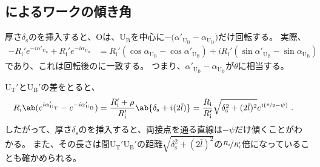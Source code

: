 \subsection{\Spacer によるワークの傾き角}
厚さ$\delta_\mathrm s$の\Spacer を挿入すると、\CurvatureCenter Oは、U$_\mathrm B$を中心に$-\big(\alpha'_{\mathrm U_\mathrm B}\!-\alpha_{\mathrm U_\mathrm B}\big)$だけ回転する。
実際、
\begin{align*}
  -R_\mathrm i'e^{-i\alpha'_{\mathrm U_\mathrm B}}+R_\mathrm i'e^{-i\alpha_{\mathrm U_\mathrm B}}
  &= R_\mathrm i'(\cos\alpha_{\mathrm U_\mathrm B}-\cos\alpha'_{\mathrm U_\mathrm B})
     +iR_\mathrm i'(\sin\alpha'_{\mathrm U_\mathrm B}-\sin\alpha_{\mathrm U_\mathrm B})
\end{align*}
であり、これは回転後の\nameCurvatureCenter{}に一致する。
つまり、$\alpha'_{\mathrm U_\mathrm B}\!-\alpha_{\mathrm U_\mathrm B}$が$\theta$に相当する。
\begin{hosoku}
\TopSideReceiverPlateContactPoint U$_\mathrm T'$と\BottomSideReceiverPlateContactPoint U$_\mathrm B'$の差をとると、
\begin{align*}
  R_\mathrm i\ab(e^{i\alpha_{\mathrm U_\mathrm T}'}-e^{-i\alpha'_{\mathrm U_\mathrm B}})
  &= \frac{R_\mathrm i'+\rho}{R_\mathrm i'}\ab\{\delta_\mathrm s+i(2\bar l)\}
   = \frac{R_\mathrm i}{R_\mathrm i'}\sqrt{\delta_\mathrm s^2+(2\bar l)^2}e^{i(\nicefrac\pi2-\psi)}\ .
\end{align*}
したがって、厚さ$\delta_\mathrm s$の\Spacer を挿入すると、両接点を通る直線は$-\psi$だけ傾くことがわかる。
また、その長さは\ReceiverPlateCenter 間U$_\mathrm T'$U$_\mathrm B'$の距離$\sqrt{\delta_\mathrm s^2+(2\bar l)^2}$の$\nicefrac{R_i}{R_i'}$倍になっていることも確かめられる。
\end{hosoku}



